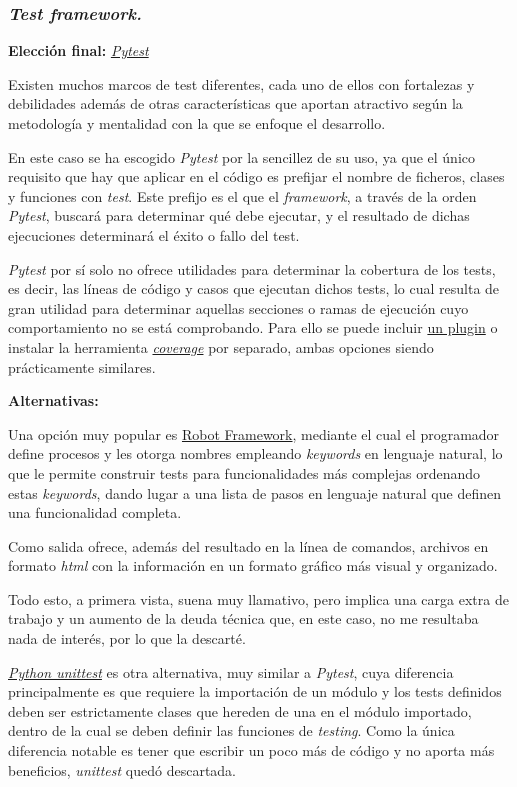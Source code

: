 \subsubsection{\textit{Test framework.}}

\textbf{Elección final:} \href{https://docs.Pytest.org/}{\textit{Pytest}}

Existen muchos marcos de test diferentes, cada uno de ellos con fortalezas y debilidades además de otras características que aportan atractivo según la metodología y mentalidad con la que se enfoque el desarrollo.

En este caso se ha escogido \textit{Pytest} por la sencillez de su uso, ya que el único requisito que hay que aplicar en el código es prefijar el nombre de ficheros, clases y funciones con \textit{test}. Este prefijo es el que el \textit{framework}, a través de la orden \textit{Pytest}, buscará para determinar qué debe ejecutar, y el resultado de dichas ejecuciones determinará el éxito o fallo del test.

\textit{Pytest} por sí solo no ofrece utilidades para determinar la cobertura de los tests, es decir, las líneas de código y casos que ejecutan dichos tests, lo cual resulta de gran utilidad para determinar aquellas secciones o ramas de ejecución cuyo comportamiento no se está comprobando. Para ello se puede incluir \href{https://pypi.org/project/pytest-cov/}{un plugin} o instalar la herramienta \href{https://coverage.readthedocs.io/}{\textit{coverage}} por separado, ambas opciones siendo prácticamente similares.

\textbf{Alternativas:}

Una opción muy popular es \href{https://robotframework.org/}{Robot Framework}, mediante el cual el programador define procesos y les otorga nombres empleando \textit{keywords} en lenguaje natural, lo que le permite construir tests para funcionalidades más complejas ordenando estas \textit{keywords}, dando lugar a una lista de pasos en lenguaje natural que definen una funcionalidad completa.

Como salida ofrece, además del resultado en la línea de comandos, archivos en formato \textit{html} con la información en un formato gráfico más visual y organizado.

Todo esto, a primera vista, suena muy llamativo, pero implica una carga extra de trabajo y un aumento de la deuda técnica que, en este caso, no me resultaba nada de interés, por lo que la descarté.

\href{https://docs.python.org/3/library/unittest.html}{\textit{Python unittest}} es otra alternativa, muy similar a \textit{Pytest}, cuya diferencia principalmente es que requiere la importación de un módulo y los tests definidos deben ser estrictamente clases que hereden de una en el módulo importado, dentro de la cual se deben definir las funciones de \textit{testing}. Como la única diferencia notable es tener que escribir un poco más de código y no aporta más beneficios, \textit{unittest} quedó descartada.

